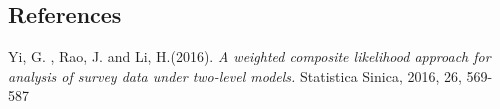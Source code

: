 \documentclass[12pt]{article}
\begin{document}
%        
%
%        

\subsection*{References}

\begin{description}

\item
Yi, G. ,  Rao, J.  and  Li, H.(2016).
\textit{A weighted composite likelihood approach for analysis of survey data under two-level models.}
Statistica Sinica, 2016, 26, 569-587


\end{description}
\end{document}
